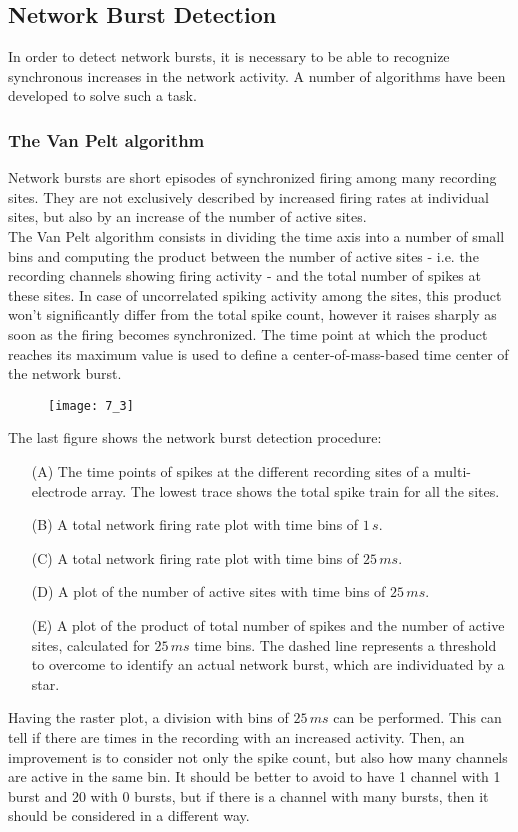 \subsection{Network Burst Detection}
In order to detect network bursts, it is necessary to be able to recognize synchronous
increases in the network activity. A number of algorithms have been developed to
solve such a task.
\subsubsection{The Van Pelt algorithm}
Network bursts are short episodes of synchronized firing among many recording sites.
They are not exclusively described by increased firing rates at individual sites, but
also by an increase of the number of active sites.\\
The Van Pelt algorithm consists in dividing the time axis into a number of small bins
and computing the product between the number of active sites - i.e. the recording channels
showing firing activity - and the total number of spikes at these sites. In case of
uncorrelated spiking activity among the sites, this product won't significantly
differ from the total spike count, however it raises sharply as soon as the firing
becomes synchronized. The time point at which the product reaches its maximum value is
used to define a center-of-mass-based time center of the network burst.
\begin{figure}[H]
    \texttt{[image: 7\_3]}
    \centering
\end{figure}
\pagebreak
The last figure shows the network burst detection procedure:
\begin{itemize}
    \item[(A)] The time points of spikes at the different recording sites of
        a multi-electrode array. The lowest trace shows the total spike train for all
        the sites.
    \item[(B)] A total network firing rate plot with time bins of \(1\,s\).
    \item[(C)] A total network firing rate plot with time bins of \(25\,ms\).
    \item[(D)] A plot of the number of active sites with time bins
        of \(25\,ms\).
    \item[(E)] A plot of the product of total number of spikes and the
        number of active sites, calculated for \(25\,ms\) time bins. The dashed line
        represents a threshold to overcome to identify an actual network burst, which
        are individuated by a star.
\end{itemize}
Having the raster plot, a division with bins of \(25\,ms\) can be performed. This can
tell if there are times in the recording with an increased activity. Then, an
improvement is to consider not only the spike count, but also how many channels are
active in the same bin. It should be better to avoid to have 1 channel with 1 burst
and 20 with 0 bursts, but if there is a channel with many bursts, then it should be
considered in a different way.
